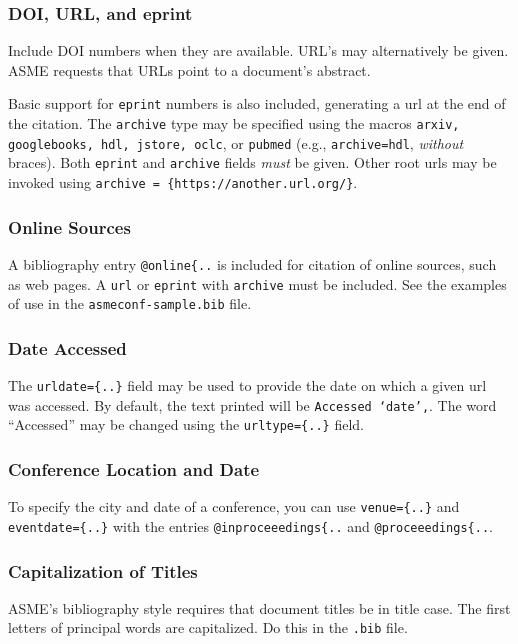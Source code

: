 \documentclass[balance,upint,subscriptcorrection,varvw,mathalfa=cal=boondoxo,spanish,french,vietnamese,russian,greek,pdf-a,fontspec,colorlinks]{asmeconf}
\begin{document}
\subsubsection*{DOI, URL, and eprint} Include DOI numbers when they are available.  URL's may alternatively be given. ASME requests that URLs point to a document's abstract.

Basic support for \texttt{eprint} numbers is also included, generating a url at the end of the citation. The \texttt{archive} type may be specified using the macros \texttt{arxiv, google\-books, hdl, jstore, oclc}, or \texttt{pubmed} (e.g., \texttt{archive=hdl},  \textit{without} braces). Both \texttt{eprint} and \texttt{archive} fields \textit{must} be given. Other root urls may be invoked using \verb|archive = {https://another.url.org/}|.

\subsubsection*{Online Sources} A bibliography entry \verb|@online{..| is included for citation of online sources, such as web pages. A \texttt{url} or \texttt{eprint} with \texttt{archive} must be included. See the examples of use in the \texttt{asmeconf-sample.bib} file. 

\subsubsection*{Date Accessed} The \verb|urldate={..}| field may be used to provide the date on which a given url was accessed. By default, the text printed will be \texttt{Accessed `date',}. The word ``Accessed'' may be changed using the \verb|urltype={..}| field.

\subsubsection*{Conference Location and Date} To specify the city and date of a conference, you can use \verb|venue={..}| and \verb|eventdate={..}| with the entries \verb|@inproceeedings{..| and \verb|@proceeedings{..|.

\subsubsection*{Capitalization of Titles} ASME's bibliography style requires that document titles be in title case. The first letters of principal words are capitalized. Do this in the \texttt{.bib} file.
\end{document}
